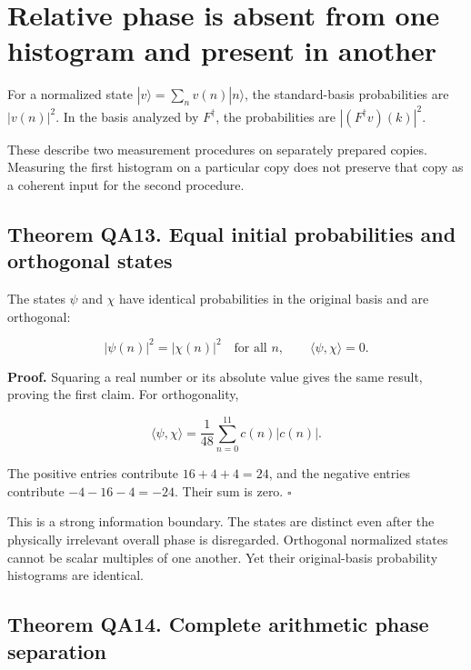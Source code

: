 \hypertarget{q:relative-phase-is-absent-from-one-histogram-and-present-in-another}{%
\section{Relative phase is absent from one histogram and present in
another}\label{q:relative-phase-is-absent-from-one-histogram-and-present-in-another}}

For a normalized state \(|v\rangle=\sum_nv(n)|n\rangle\), the
standard-basis probabilities are \(|v(n)|^2\). In the basis analyzed by
\(F^\dagger\), the probabilities are \(|(F^\dagger v)(k)|^2\).

These describe two measurement procedures on separately prepared copies.
Measuring the first histogram on a particular copy does not preserve
that copy as a coherent input for the second procedure.

\hypertarget{q:theorem-qa13.-equal-initial-probabilities-and-orthogonal-states}{%
\subsection*{Theorem QA13. Equal initial probabilities and orthogonal
states}\label{q:theorem-qa13.-equal-initial-probabilities-and-orthogonal-states}}

The states \(\psi\) and \(\chi\) have identical probabilities in the
original basis and are orthogonal:

\[
|\psi(n)|^2=|\chi(n)|^2\quad\text{for all }n,
\qquad \langle\psi,\chi\rangle=0.
\]

\textbf{Proof.} Squaring a real number or its absolute value gives the
same result, proving the first claim. For orthogonality,

\[
\langle\psi,\chi\rangle
=\frac1{48}\sum_{n=0}^{11}c(n)|c(n)|.
\]

The positive entries contribute \(16+4+4=24\), and the negative entries
contribute \(-4-16-4=-24\). Their sum is zero. \(\square\)

This is a strong information boundary. The states are distinct even
after the physically irrelevant overall phase is disregarded. Orthogonal
normalized states cannot be scalar multiples of one another. Yet their
original-basis probability histograms are identical.

\hypertarget{q:theorem-qa14.-complete-arithmetic-phase-separation}{%
\subsection*{Theorem QA14. Complete arithmetic phase
separation}\label{q:theorem-qa14.-complete-arithmetic-phase-separation}}

